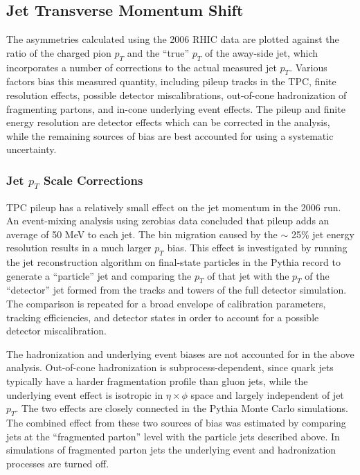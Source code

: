 \subsection{Jet Transverse Momentum Shift}

The asymmetries calculated using the 2006 RHIC data are plotted against the
ratio of the charged pion \(p_{T}\) and the ``true'' \(p_{T}\) of the away-side
jet, which incorporates a number of corrections to the actual measured jet
\(p_T\). Various factors bias this measured quantity, including pileup tracks in
the TPC, finite resolution effects, possible detector miscalibrations,
out-of-cone hadronization of fragmenting partons, and in-cone underlying event
effects. The pileup and finite energy resolution are detector effects which can
be corrected in the analysis, while the remaining sources of bias are best
accounted for using a systematic uncertainty.

\subsubsection{Jet $p_T$ Scale Corrections}

TPC pileup has a relatively small effect on the jet momentum in the 2006 run. An
event-mixing analysis using zerobias data concluded that pileup adds an average
of 50 MeV to each jet. The bin migration caused by the $\sim$ 25\% jet energy
resolution results in a much larger \(p_T\) bias. This effect is investigated by
running the jet reconstruction algorithm on final-state particles in the Pythia
record to generate a ``particle'' jet and comparing the \(p_{T}\) of that jet
with the \(p_{T}\) of the ``detector'' jet formed from the tracks and towers of
the full detector simulation. The comparison is repeated for a broad envelope of
calibration parameters, tracking efficiencies, and detector states in order to
account for a possible detector miscalibration.

The hadronization and underlying event biases are not accounted for in the above
analysis. Out-of-cone hadronization is subprocess-dependent, since quark jets
typically have a harder fragmentation profile than gluon jets, while the
underlying event effect is isotropic in \(\eta \times \phi\) space and largely
independent of jet \(p_T\). The two effects are closely connected in the Pythia
Monte Carlo simulations. The combined effect from these two sources of bias was
estimated by comparing jets at the ``fragmented parton'' level with the particle
jets described above. In simulations of fragmented parton jets the underlying
event and hadronization processes are turned off.

